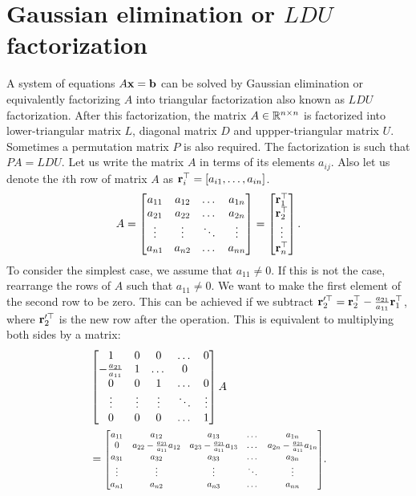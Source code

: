 \documentclass[twocolumn]{article}
\begin{document}
\section{Gaussian elimination or  $LDU$  factorization}
A system  of  equations   $A\mathbf{x} =  \mathbf{b}$  can  be  solved by  Gaussian
elimination or   equivalently factorizing   $A$  into  triangular
factorization    also   known  as   $LDU$  factorization. After  this
factorization, the  matrix $A \in  \mathbb{R}^{n \times n}$ is factorized into
lower-triangular matrix $L$, diagonal matrix $D$ and  uppper-triangular   matrix
$U$. Sometimes a permutation matrix $P$  is  also required. The  factorization
is  such  that   $PA = LDU$.
Let  us   write  the  matrix   $A$ in   terms   of   its    elements  $a_{ij}$.
Also let  us   denote the $i$th    row of matrix $A$  as $\mathbf{r}_i^\top   =   [a_{i1},
\dots,   a_{in}]$.
\begin{align}
  A   =  \begin{bmatrix}
    a_{11} & a_{12}  &   \dots &  a_{1n} \\
    a_{21} & a_{22}  &   \dots &  a_{2n} \\
    \vdots &  \vdots  & \ddots & \vdots \\
    a_{n1} & a_{n2}  &   \dots &  a_{nn}
    \end{bmatrix}  =  \begin{bmatrix}  \mathbf{r}_1^\top  \\  \mathbf{r}_2^\top \\ \vdots \\ \mathbf{r}_n^\top\end{bmatrix}.
\end{align}
To consider  the  simplest  case, we   assume that $a_{11}
\ne 0$.  If  this is not the case, rearrange the rows of $A$ such that $a_{11}
\ne 0$. We want  to make the first element of  the second row to  be zero. This  can  be achieved if  we subtract $\mathbf{r}'^\top_2 =  \mathbf{r}_2^\top -
\frac{a_{21}}{a_{11}}   \mathbf{r}_1^\top$, where $\mathbf{r}'^\top_2$ is  the  new  row
after the  operation. This is  equivalent to multiplying both sides
by a  matrix:
\begin{align*}
 &\begin{bmatrix} 1  & 0  &  0 &  \dots  & 0 \\
  -\frac{a_{21}}{a_{11}} & 1  & \dots  &   0  \\
  0 & 0  & 1 & \dots  &   0  \\
  \vdots  & \vdots &  \vdots  &   \ddots  &  \vdots   \\
  0 & 0 &  0   &  \dots  & 1
\end{bmatrix}A  \\
&=  \scalebox{0.8}{\mbox{$\begin{bmatrix}
  a_{11} & a_{12}  &  a_{13} &     \dots &  a_{1n} \\
  0 & a_{22}-\frac{a_{21}}{a_{11}}a_{12}  & a_{23}-\frac{a_{21}}{a_{11}}a_{13} &  \dots &  a_{2n} -\frac{a_{21}}{a_{11}}a_{1n}\\
  a_{31} & a_{32}  &  a_{33} &     \dots &  a_{3n} \\
  \vdots &  \vdots  & \vdots &  \ddots & \vdots \\
  a_{n1} & a_{n2}  &  a_{n3} &   \dots &  a_{nn}
\end{bmatrix}$}}.
\end{align*}
\end{document}
